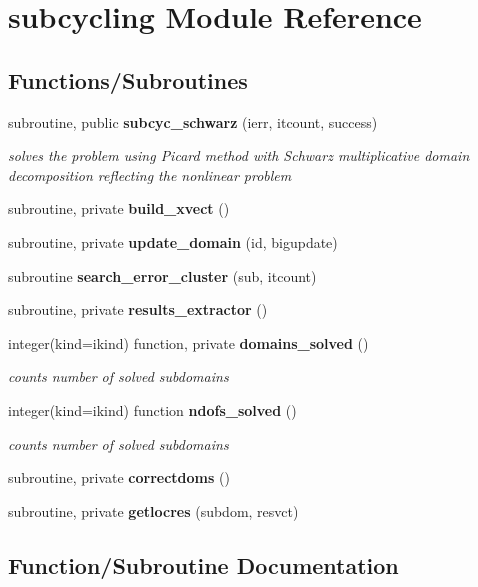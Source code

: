 \section{subcycling Module Reference}
\label{namespacesubcycling}
\subsection*{Functions/\+Subroutines}
\begin{DoxyCompactItemize}
\item 
subroutine, public {\bf subcyc\+\_\+schwarz} (ierr, itcount, success)
\begin{DoxyCompactList}\small\item\em solves the problem using Picard method with Schwarz multiplicative domain decomposition reflecting the nonlinear problem \end{DoxyCompactList}\item 
subroutine, private {\bf build\+\_\+xvect} ()
\item 
subroutine, private {\bf update\+\_\+domain} (id, bigupdate)
\item 
subroutine {\bf search\+\_\+error\+\_\+cluster} (sub, itcount)
\item 
subroutine, private {\bf results\+\_\+extractor} ()
\item 
integer(kind=ikind) function, private {\bf domains\+\_\+solved} ()
\begin{DoxyCompactList}\small\item\em counts number of solved subdomains \end{DoxyCompactList}\item 
integer(kind=ikind) function {\bf ndofs\+\_\+solved} ()
\begin{DoxyCompactList}\small\item\em counts number of solved subdomains \end{DoxyCompactList}\item 
subroutine, private {\bf correctdoms} ()
\item 
subroutine, private {\bf getlocres} (subdom, resvct)
\end{DoxyCompactItemize}


\subsection{Function/\+Subroutine Documentation}
